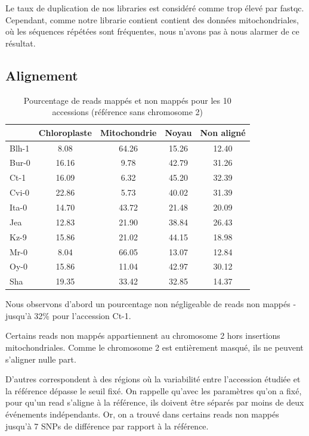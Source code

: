 \documentclass[a4paper]{article}
\begin{document}
Le taux de duplication de nos libraries est considéré comme trop élevé par fastqc. Cependant, comme notre librarie contient contient des données mitochondriales, où les séquences répétées sont fréquentes, nous n'avons pas à nous alarmer de ce résultat. 

\subsection{Alignement}

\begin{table}[!ht]
\centering
\begin{tabular}{|l|cccc|}
  \hline
 & Chloroplaste & Mitochondrie & Noyau & Non aligné \\ 
 \hline
Blh-1 & 8.08 & 64.26 & 15.26 & 12.40 \\ 
  Bur-0 & 16.16 & 9.78 & 42.79 & 31.26  \\ 
  Ct-1 & 16.09 & 6.32 & 45.20 & 32.39  \\ 
  Cvi-0 & 22.86 & 5.73 & 40.02 & 31.39  \\ 
  Ita-0 & 14.70 & 43.72 & 21.48 & 20.09  \\ 
  Jea & 12.83 & 21.90 & 38.84 & 26.43  \\ 
  Kz-9 & 15.86 & 21.02 & 44.15 & 18.98  \\ 
  Mr-0 & 8.04 & 66.05 & 13.07 & 12.84  \\ 
  Oy-0 & 15.86 & 11.04 & 42.97 & 30.12 \\ 
  Sha & 19.35 & 33.42 & 32.85 & 14.37 \\ 
  \hline
\end{tabular}
\caption{Pourcentage de reads mappés et non mappés pour les 10 accessions (référence sans chromosome 2)}
\end{table}

Nous observons d'abord un pourcentage non négligeable de reads non mappés - jusqu'à 32\% pour l'accession Ct-1. 

Certains reads non mappés appartiennent au chromosome 2 hors insertions mitochondriales. Comme le chromosome 2 est entièrement masqué, ils ne peuvent s'aligner nulle part. 

D'autres correspondent à des régions où la variabilité entre l'accession étudiée et la référence dépasse le seuil fixé. On rappelle qu'avec les paramètres qu'on a fixé, pour qu'un read s'aligne à la référence, ils doivent être séparés par moins de deux événements indépendants. Or, on a trouvé dans certains reads non mappés jusqu'à 7 SNPs de différence par rapport à la référence. 
\end{document}
